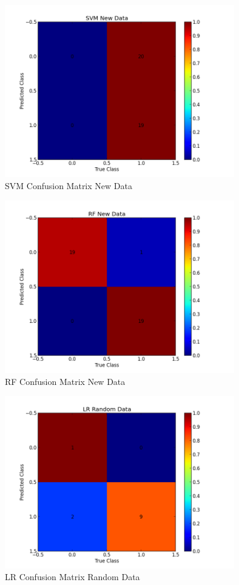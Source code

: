 \begin{figure}[!h]
 \centering
\includegraphics[width=10cm]{SVMCMNewData}
  \caption[SVM Confusion Matrix New Data]
   {SVM Confusion Matrix New Data}
\end{figure}\leavevmode 

\begin{figure}[!h]
 \centering
\includegraphics[width=10cm]{RFCMNewData}
  \caption[RF Confusion Matrix New Data]
   {RF Confusion Matrix New Data}
\end{figure}\leavevmode 

\begin{figure}[!h]
 \centering
\includegraphics[width=10cm]{LRCMRandomData}
  \caption[LR Confusion Matrix Random Data]
   {LR Confusion Matrix Random Data}
\end{figure}\leavevmode 

